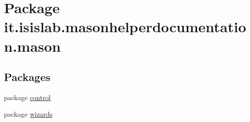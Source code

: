 \hypertarget{namespaceit_1_1isislab_1_1masonhelperdocumentation_1_1mason}{\section{Package it.\-isislab.\-masonhelperdocumentation.\-mason}
\label{namespaceit_1_1isislab_1_1masonhelperdocumentation_1_1mason}
}
\subsection*{Packages}
\begin{DoxyCompactItemize}
\item 
package \hyperlink{namespaceit_1_1isislab_1_1masonhelperdocumentation_1_1mason_1_1control}{control}
\item 
package \hyperlink{namespaceit_1_1isislab_1_1masonhelperdocumentation_1_1mason_1_1wizards}{wizards}
\end{DoxyCompactItemize}

